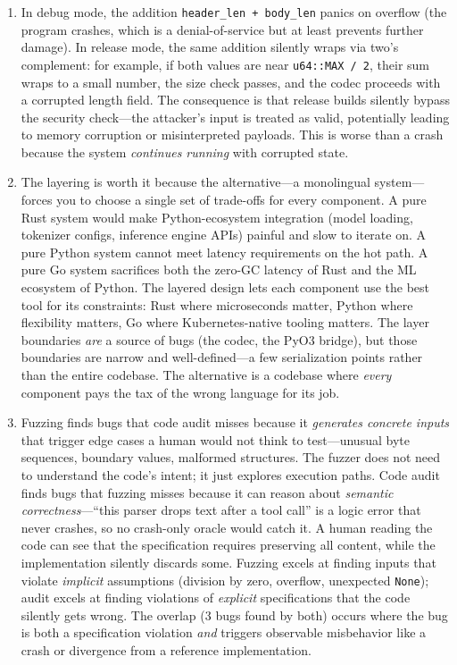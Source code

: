 \begin{enumerate}
  \item In debug mode, the addition \texttt{header\_len + body\_len} panics on overflow (the program crashes, which is a denial-of-service but at least prevents further damage). In release mode, the same addition silently wraps via two's complement: for example, if both values are near \texttt{u64::MAX / 2}, their sum wraps to a small number, the size check passes, and the codec proceeds with a corrupted length field. The consequence is that release builds silently bypass the security check---the attacker's input is treated as valid, potentially leading to memory corruption or misinterpreted payloads. This is worse than a crash because the system \emph{continues running} with corrupted state.

  \item The layering is worth it because the alternative---a monolingual system---forces you to choose a single set of trade-offs for every component. A pure Rust system would make Python-ecosystem integration (model loading, tokenizer configs, inference engine APIs) painful and slow to iterate on. A pure Python system cannot meet latency requirements on the hot path. A pure Go system sacrifices both the zero-GC latency of Rust and the ML ecosystem of Python. The layered design lets each component use the best tool for its constraints: Rust where microseconds matter, Python where flexibility matters, Go where Kubernetes-native tooling matters. The layer boundaries \emph{are} a source of bugs (the codec, the PyO3 bridge), but those boundaries are narrow and well-defined---a few serialization points rather than the entire codebase. The alternative is a codebase where \emph{every} component pays the tax of the wrong language for its job.

  \item Fuzzing finds bugs that code audit misses because it \emph{generates concrete inputs} that trigger edge cases a human would not think to test---unusual byte sequences, boundary values, malformed structures. The fuzzer does not need to understand the code's intent; it just explores execution paths. Code audit finds bugs that fuzzing misses because it can reason about \emph{semantic correctness}---``this parser drops text after a tool call'' is a logic error that never crashes, so no crash-only oracle would catch it. A human reading the code can see that the specification requires preserving all content, while the implementation silently discards some. Fuzzing excels at finding inputs that violate \emph{implicit} assumptions (division by zero, overflow, unexpected \texttt{None}); audit excels at finding violations of \emph{explicit} specifications that the code silently gets wrong. The overlap (3 bugs found by both) occurs where the bug is both a specification violation \emph{and} triggers observable misbehavior like a crash or divergence from a reference implementation.
\end{enumerate}

\label{ch:introduction}
